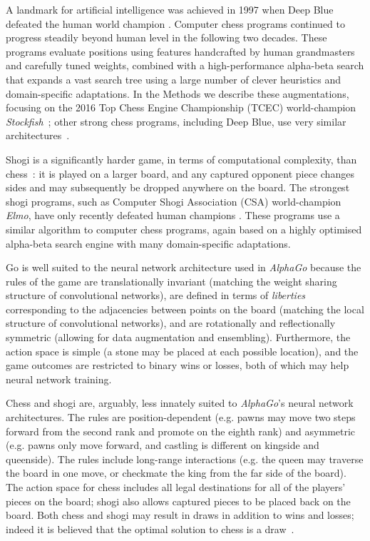 \documentclass[12pt]{article}
\begin{document}
A landmark for artificial intelligence was achieved in 1997 when Deep Blue defeated the human world champion \cite{Campbell02DeepBlue}. Computer chess programs continued to progress steadily beyond human level in the following two decades. These programs evaluate positions using features handcrafted by human grandmasters and carefully tuned weights, combined with a high-performance alpha-beta search that expands a vast search tree using a large number of clever heuristics and domain-specific adaptations. In the Methods we describe these augmentations, focusing on the 2016 Top Chess Engine Championship (TCEC) world-champion \emph{Stockfish}~\cite{Stockfish}; other strong chess programs, including Deep Blue, use very similar architectures~\cite{Campbell02DeepBlue,LevyNewborn09}.




Shogi is a significantly harder game, in terms of computational complexity, than chess~\cite{Allis94,Iida02Shogi}: it is played on a larger board, and any captured opponent piece changes sides and may subsequently be dropped anywhere on the board. The strongest shogi programs, such as Computer Shogi Association (CSA) world-champion \emph{Elmo}, have only recently defeated human champions \cite{WCSC27}. These programs use a similar algorithm to computer chess programs, again based on a highly optimised alpha-beta search engine with many domain-specific adaptations.  




Go is well suited to the neural network architecture used in \emph{AlphaGo} because the rules of the game are translationally invariant (matching the weight sharing structure of convolutional networks), are defined in terms of \emph{liberties} corresponding to the adjacencies between points on the board (matching the local structure of convolutional networks), and are rotationally and reflectionally symmetric (allowing for data augmentation and ensembling). Furthermore, the action space is simple (a stone may be placed at each possible location), and the game outcomes are restricted to binary wins or losses, both of which may help neural network training. 

Chess and shogi are, arguably, less innately suited to \emph{AlphaGo}'s neural network architectures. The rules are position-dependent (e.g. pawns may move two steps forward from the second rank and promote on the eighth rank) and asymmetric (e.g. pawns only move forward, and castling is different on kingside and queenside). The rules include long-range interactions (e.g. the queen may traverse the board in one move, or checkmate the king from the far side of the board). The action space for chess includes all legal destinations for all of the players' pieces on the board; shogi also allows captured pieces to be placed back on the board. Both chess and shogi may result in draws in addition to wins and losses; indeed it is believed that the optimal solution to chess is a draw~\cite{Steinitz90Modern,Lasker65Common,Knudsen00Essential}.
\end{document}
